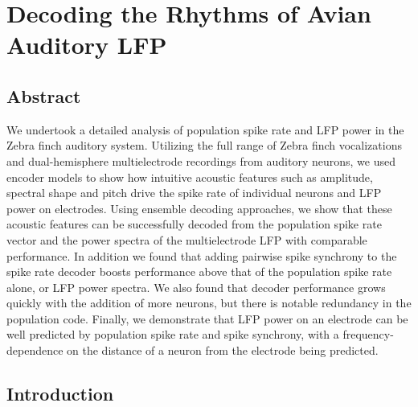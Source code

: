\chapter{Decoding the Rhythms of Avian Auditory LFP}

\section{Abstract}
We undertook a detailed analysis of population spike rate and LFP power in the Zebra finch auditory system. Utilizing the full range of Zebra finch vocalizations and dual-hemisphere multielectrode recordings from auditory neurons, we used encoder models to show how intuitive acoustic features such as amplitude, spectral shape and pitch drive the spike rate of individual neurons and  LFP power on electrodes. Using ensemble decoding approaches, we show that these acoustic features can be successfully decoded from the population spike rate vector and the power spectra of the multielectrode LFP with comparable performance. In addition we found that adding pairwise spike synchrony to the spike rate decoder boosts performance above that of the population spike rate alone, or LFP power spectra. We also found that decoder performance grows quickly with the addition of more neurons, but there is notable redundancy in the population code. Finally, we demonstrate that LFP power on an electrode can be well predicted by population spike rate and spike synchrony, with a frequency-dependence on the distance of a neuron from the electrode being predicted.


\section{Introduction}

